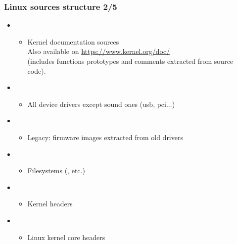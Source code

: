 \begin{frame}
  \frametitle{Linux sources structure 2/5}
  \begin{itemize}
  \item {}
    \begin{itemize}
    \item Kernel documentation sources\\
     Also available on \url{https://www.kernel.org/doc/}\\
     (includes functions prototypes and comments
     extracted from source code). 
    \end{itemize}
  \item {}
    \begin{itemize}
    \item All device drivers except sound ones (usb, pci...)
    \end{itemize}
  \item {}
    \begin{itemize}
    \item Legacy: firmware images extracted from old drivers
    \end{itemize}
  \item {}
    \begin{itemize}
    \item Filesystems (, etc.)
    \end{itemize}
  \item {}
    \begin{itemize}
    \item Kernel headers
    \end{itemize}
  \item {}
    \begin{itemize}
    \item Linux kernel core headers
    \end{itemize}
  \end{itemize}
\end{frame}

